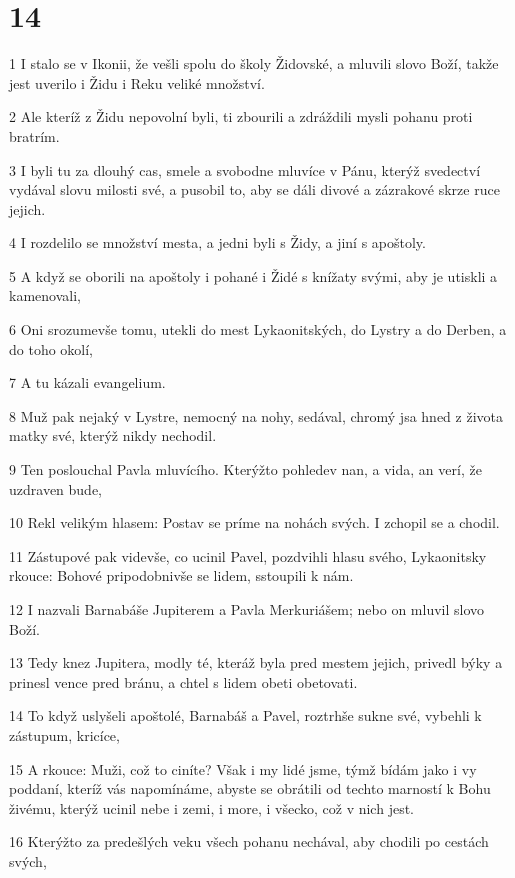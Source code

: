 \chapter{14}

\par 1 I stalo se v Ikonii, že vešli spolu do školy Židovské, a mluvili slovo Boží, takže jest uverilo i Židu i Reku veliké množství.
\par 2 Ale kteríž z Židu nepovolní byli, ti zbourili a zdráždili mysli pohanu proti bratrím.
\par 3 I byli tu za dlouhý cas, smele a svobodne mluvíce v Pánu, kterýž svedectví vydával slovu milosti své, a pusobil to, aby se dáli divové a zázrakové skrze ruce jejich.
\par 4 I rozdelilo se množství mesta, a jedni byli s Židy, a jiní s apoštoly.
\par 5 A když se oborili na apoštoly i pohané i Židé s knížaty svými, aby je utiskli a kamenovali,
\par 6 Oni srozumevše tomu, utekli do mest Lykaonitských, do Lystry a do Derben, a do toho okolí,
\par 7 A tu kázali evangelium.
\par 8 Muž pak nejaký v Lystre, nemocný na nohy, sedával, chromý jsa hned z života matky své, kterýž nikdy nechodil.
\par 9 Ten poslouchal Pavla mluvícího. Kterýžto pohledev nan, a vida, an verí, že uzdraven bude,
\par 10 Rekl velikým hlasem: Postav se príme na nohách svých. I zchopil se a chodil.
\par 11 Zástupové pak videvše, co ucinil Pavel, pozdvihli hlasu svého, Lykaonitsky rkouce: Bohové pripodobnivše se lidem, sstoupili k nám.
\par 12 I nazvali Barnabáše Jupiterem a Pavla Merkuriášem; nebo on mluvil slovo Boží.
\par 13 Tedy knez Jupitera, modly té, kteráž byla pred mestem jejich, privedl býky a prinesl vence pred bránu, a chtel s lidem obeti obetovati.
\par 14 To když uslyšeli apoštolé, Barnabáš a Pavel, roztrhše sukne své, vybehli k zástupum, kricíce,
\par 15 A rkouce: Muži, což to ciníte? Však i my lidé jsme, týmž bídám jako i vy poddaní, kteríž vás napomínáme, abyste se obrátili od techto marností k Bohu živému, kterýž ucinil nebe i zemi, i more, i všecko, což v nich jest.
\par 16 Kterýžto za predešlých veku všech pohanu nechával, aby chodili po cestách svých,
